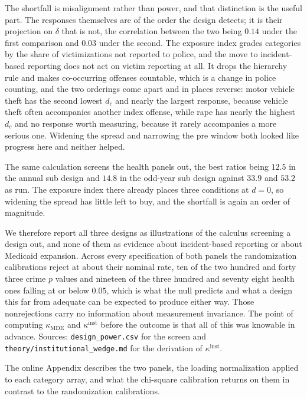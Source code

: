 \documentclass[12pt]{article}
\theoremstyle{definition}
\numberwithin{equation}{section}
\begin{document}
The shortfall is misalignment rather than power, and that distinction is the
useful part. The responses themselves are of the order the design detects; it is
their projection on $\delta$ that is not, the correlation between the two being
$0.14$ under the first comparison and $0.03$ under the second. The exposure index
grades categories by the share of victimizations not reported to police, and the
move to incident-based reporting does not act on victim reporting at all. It
drops the hierarchy rule and makes co-occurring offenses countable, which is a
change in police counting, and the two orderings come apart and in places
reverse: motor vehicle theft has the second lowest $d_c$ and nearly the largest
response, because vehicle theft often accompanies another index offense, while
rape has nearly the highest $d_c$ and no response worth measuring, because it
rarely accompanies a more serious one. Widening the spread and narrowing the pre
window both looked like progress here and neither helped.

The same calculation screens the health panels out, the best ratios being $12.5$
in the annual sub design and $14.8$ in the odd-year sub design against $33.9$
and $53.2$ as run. The exposure index there already places three conditions at
$d = 0$, so widening the spread has little left to buy, and the shortfall is
again an order of magnitude.

We therefore report all three designs as illustrations of the calculus screening
a design out, and none of them as evidence about incident-based reporting or
about Medicaid expansion. Across every specification of both panels the
randomization calibrations reject at about their nominal rate, ten of the two
hundred and forty three crime $p$ values and nineteen of the three hundred and
seventy eight health ones falling at or below $0.05$, which is what the null
predicts and what a design this far from adequate can be expected to produce
either way. Those nonrejections carry no information about measurement
invariance. The point of computing $\kappa_{\mathrm{MDE}}$ and
$\kappa^{\mathrm{inst}}$ before the outcome is that all of this was knowable in
advance. Sources: \texttt{design\_power.csv} for the screen and
\texttt{theory/institutional\_wedge.md} for the derivation of
$\kappa^{\mathrm{inst}}$.

The online Appendix describes the two panels, the loading normalization
applied to each category array, and what the chi-square calibration returns
on them in contrast to the randomization calibrations.
\end{document}
